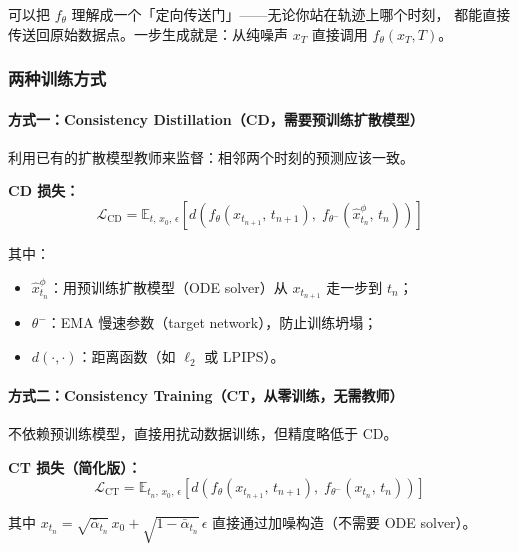 \begin{intubox}
可以把 $f_\theta$ 理解成一个「定向传送门」——无论你站在轨迹上哪个时刻，
都能直接传送回原始数据点。一步生成就是：从纯噪声 $x_T$ 直接调用 $f_\theta(x_T, T)$。
\end{intubox}

\subsubsection*{两种训练方式}

\paragraph{方式一：Consistency Distillation（CD，需要预训练扩散模型）}

利用已有的扩散模型教师来监督：相邻两个时刻的预测应该一致。

\begin{conceptbox}
\textbf{CD 损失：}
$$\mathcal{L}_\text{CD} = \mathbb{E}_{t,\, x_0,\, \epsilon}\!\left[
  d\!\left(f_\theta(x_{t_{n+1}},\, t_{n+1}),\;
            f_{\theta^-}(\hat{x}_{t_n}^{\phi},\, t_n)\right)\right]$$

其中：
\begin{itemize}
  \item $\hat{x}_{t_n}^{\phi}$：用预训练扩散模型（ODE solver）从 $x_{t_{n+1}}$ 走一步到 $t_n$；
  \item $\theta^-$：EMA 慢速参数（target network），防止训练坍塌；
  \item $d(\cdot,\cdot)$：距离函数（如 $\ell_2$ 或 LPIPS）。
\end{itemize}
\end{conceptbox}

\paragraph{方式二：Consistency Training（CT，从零训练，无需教师）}

不依赖预训练模型，直接用扰动数据训练，但精度略低于 CD。

\begin{conceptbox}
\textbf{CT 损失（简化版）：}
$$\mathcal{L}_\text{CT} = \mathbb{E}_{t_n,\, x_0,\, \epsilon}\!\left[
  d\!\left(f_\theta(x_{t_{n+1}},\, t_{n+1}),\;
            f_{\theta^-}(x_{t_n},\, t_n)\right)\right]$$

其中 $x_{t_n} = \sqrt{\bar{\alpha}_{t_n}}\,x_0 + \sqrt{1-\bar{\alpha}_{t_n}}\,\epsilon$
直接通过加噪构造（不需要 ODE solver）。
\end{conceptbox}


